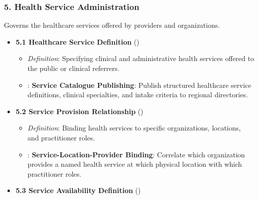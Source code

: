\subsubsection*{5. Health Service Administration}
\label{rad:enabling:190}

Governs the healthcare services offered by providers and organizations.

\label{rad:enabling:192}

\begin{itemize}

\item
\textbf{5.1 Healthcare Service Definition} (\texttt{})


\begin{itemize}

\item
\emph{Definition}: Specifying clinical and administrative health services offered to the public or clinical referrers.



\item
\texttt{}: \textbf{Service Catalogue Publishing}: Publish structured healthcare service definitions, clinical specialties, and intake criteria to regional directories.



\end{itemize}


\item
\textbf{5.2 Service Provision Relationship} (\texttt{})


\begin{itemize}

\item
\emph{Definition}: Binding health services to specific organizations, locations, and practitioner roles.



\item
\texttt{}: \textbf{Service-Location-Provider Binding}: Correlate which organization provides a named health service at which physical location with which practitioner roles.



\end{itemize}


\item
\textbf{5.3 Service Availability Definition} (\texttt{})


\begin{itemize}


\end{itemize}
\end{itemize}
